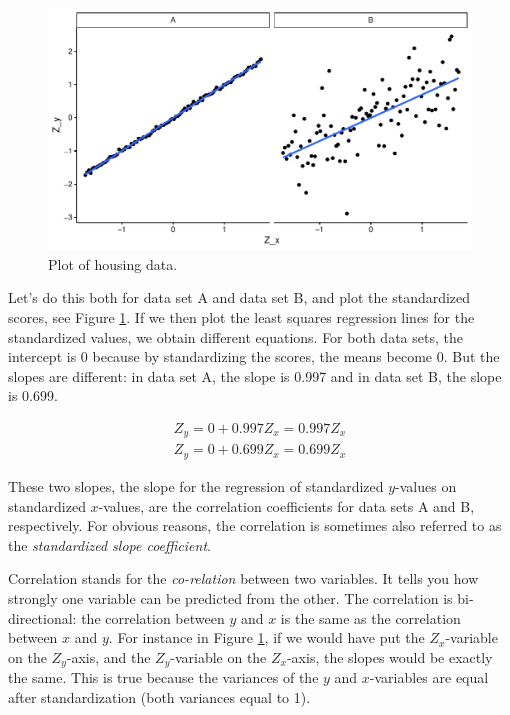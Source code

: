 \documentclass[]{book}\usepackage[]{graphicx}\usepackage[]{color}
\makeatletter
\def\maxwidth{ %
  \ifdim\Gin@nat@width>\linewidth
    \linewidth
  \else
    \Gin@nat@width
  \fi
}
\newenvironment{knitrout}{}{} %
\makeatother
\begin{document}
\begin{knitrout}
\color{fgcolor}\begin{figure}

{\centering \includegraphics[width=\maxwidth]{figure/lm_19-1} 

}

\caption[Plot of housing data]{Plot of housing data.}\label{fig:lm_19}
\end{figure}


\end{knitrout}

Let's do this both for data set A and data set B, and plot the standardized scores, see Figure \ref{fig:lm_19}. If we then plot the least squares regression lines for the standardized values, we obtain different equations. For both data sets, the intercept is 0 because by standardizing the scores, the means become 0. But the slopes are different: in data set A, the slope is 0.997 and in data set B, the slope is 0.699.

\begin{eqnarray}
Z_y = 0 + 0.997Z_x=0.997Z_x \\
Z_y = 0 + 0.699Z_x=0.699Z_x
\end{eqnarray}


These two slopes, the slope for the regression of standardized $y$-values on standardized $x$-values, are the correlation coefficients for data sets A and B, respectively. For obvious reasons, the correlation is sometimes also referred to as the \textit{standardized slope coefficient}.

Correlation stands for the \textit{co-relation} between two variables. It tells you how strongly one variable can be predicted from the other. The correlation is bi-directional: the correlation between $y$ and $x$ is the same as the correlation between $x$ and $y$. For instance in Figure \ref{fig:lm_19}, if we would have put the $Z_x$-variable on the $Z_y$-axis, and the $Z_y$-variable on the $Z_x$-axis, the slopes would be exactly the same. This is true because the variances of the $y$ and $x$-variables are equal after standardization (both variances equal to 1).
\end{document}
